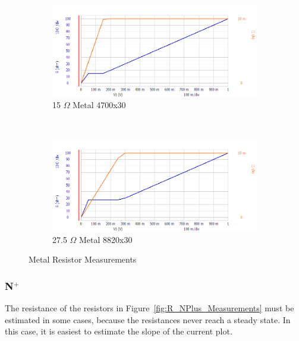 \documentclass[letter,12pt]{article}
\begin{document}
\begin{figure}[h!]
\begin{subfigure}[b]{.45\textwidth}
					\includegraphics[width=\textwidth]{./Images/Probe_Test/R_Metal_4700x30.png}
					\caption{15 $\Omega$ Metal 4700x30}
				\end{subfigure}
				~
				\begin{subfigure}[b]{.45\textwidth}
					\includegraphics[width=\textwidth]{./Images/Probe_Test/R_Metal_8820x30.png}
					\caption{27.5 $\Omega$ Metal 8820x30}
				\end{subfigure}
				\caption{Metal Resistor Measurements}
				\label{fig:R_Metal_Measurements}
			\end{figure}
		
		\FloatBarrier	
		\subsubsection{N$^+$}
			The resistance of the resistors in Figure~\ref{fig:R_NPlus_Measurements} must be estimated in some cases, because the resistances never reach a steady state.  In this case, it is easiest to estimate the slope of the current plot.
			
\end{document}
